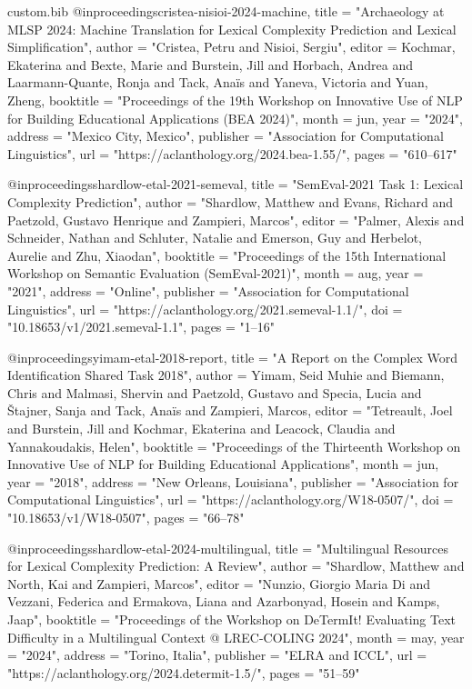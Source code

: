 \begin{filecontents*}[overwrite]{custom.bib}
@inproceedings{cristea-nisioi-2024-machine,
    title = "Archaeology at {MLSP} 2024: Machine Translation for Lexical Complexity Prediction and Lexical Simplification",
    author = "Cristea, Petru  and
      Nisioi, Sergiu",
    editor = {Kochmar, Ekaterina  and
      Bexte, Marie  and
      Burstein, Jill  and
      Horbach, Andrea  and
      Laarmann-Quante, Ronja  and
      Tack, Ana{\"i}s  and
      Yaneva, Victoria  and
      Yuan, Zheng},
    booktitle = "Proceedings of the 19th Workshop on Innovative Use of NLP for Building Educational Applications (BEA 2024)",
    month = jun,
    year = "2024",
    address = "Mexico City, Mexico",
    publisher = "Association for Computational Linguistics",
    url = "https://aclanthology.org/2024.bea-1.55/",
    pages = "610--617"
}

@inproceedings{shardlow-etal-2021-semeval,
    title = "{S}em{E}val-2021 Task 1: Lexical Complexity Prediction",
    author = "Shardlow, Matthew  and
      Evans, Richard  and
      Paetzold, Gustavo Henrique  and
      Zampieri, Marcos",
    editor = "Palmer, Alexis  and
      Schneider, Nathan  and
      Schluter, Natalie  and
      Emerson, Guy  and
      Herbelot, Aurelie  and
      Zhu, Xiaodan",
    booktitle = "Proceedings of the 15th International Workshop on Semantic Evaluation (SemEval-2021)",
    month = aug,
    year = "2021",
    address = "Online",
    publisher = "Association for Computational Linguistics",
    url = "https://aclanthology.org/2021.semeval-1.1/",
    doi = "10.18653/v1/2021.semeval-1.1",
    pages = "1--16"
}

@inproceedings{yimam-etal-2018-report,
    title = "A Report on the Complex Word Identification Shared Task 2018",
    author = {Yimam, Seid Muhie  and
      Biemann, Chris  and
      Malmasi, Shervin  and
      Paetzold, Gustavo  and
      Specia, Lucia  and
      {\v{S}}tajner, Sanja  and
      Tack, Ana{\"i}s  and
      Zampieri, Marcos},
    editor = "Tetreault, Joel  and
      Burstein, Jill  and
      Kochmar, Ekaterina  and
      Leacock, Claudia  and
      Yannakoudakis, Helen",
    booktitle = "Proceedings of the Thirteenth Workshop on Innovative Use of {NLP} for Building Educational Applications",
    month = jun,
    year = "2018",
    address = "New Orleans, Louisiana",
    publisher = "Association for Computational Linguistics",
    url = "https://aclanthology.org/W18-0507/",
    doi = "10.18653/v1/W18-0507",
    pages = "66--78"
}

@inproceedings{shardlow-etal-2024-multilingual,
    title = "Multilingual Resources for Lexical Complexity Prediction: A Review",
    author = "Shardlow, Matthew  and
      North, Kai  and
      Zampieri, Marcos",
    editor = "Nunzio, Giorgio Maria Di  and
      Vezzani, Federica  and
      Ermakova, Liana  and
      Azarbonyad, Hosein  and
      Kamps, Jaap",
    booktitle = "Proceedings of the Workshop on DeTermIt! Evaluating Text Difficulty in a Multilingual Context @ LREC-COLING 2024",
    month = may,
    year = "2024",
    address = "Torino, Italia",
    publisher = "ELRA and ICCL",
    url = "https://aclanthology.org/2024.determit-1.5/",
    pages = "51--59"
}


\end{filecontents*}
